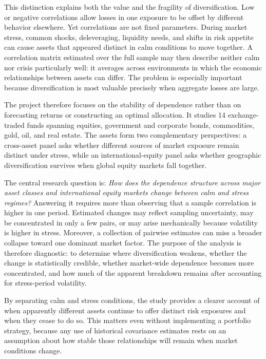 This distinction explains both the value and the fragility of diversification. Low or negative correlations allow losses in one exposure to be offset by different behavior elsewhere. Yet correlations are not fixed parameters. During market stress, common shocks, deleveraging, liquidity needs, and shifts in risk appetite can cause assets that appeared distinct in calm conditions to move together. A correlation matrix estimated over the full sample may then describe neither calm nor crisis particularly well: it averages across environments in which the economic relationships between assets can differ. The problem is especially important because diversification is most valuable precisely when aggregate losses are large.

The project therefore focuses on the stability of dependence rather than on forecasting returns or constructing an optimal allocation. It studies 14 exchange-traded funds spanning equities, government and corporate bonds, commodities, gold, oil, and real estate. The assets form two complementary perspectives: a cross-asset panel asks whether different sources of market exposure remain distinct under stress, while an international-equity panel asks whether geographic diversification survives when global equity markets fall together.

The central research question is: \emph{How does the dependence structure across major asset classes and international equity markets change between calm and stress regimes?} Answering it requires more than observing that a sample correlation is higher in one period. Estimated changes may reflect sampling uncertainty, may be concentrated in only a few pairs, or may arise mechanically because volatility is higher in stress. Moreover, a collection of pairwise estimates can miss a broader collapse toward one dominant market factor. The purpose of the analysis is therefore diagnostic: to determine where diversification weakens, whether the change is statistically credible, whether market-wide dependence becomes more concentrated, and how much of the apparent breakdown remains after accounting for stress-period volatility.

By separating calm and stress conditions, the study provides a clearer account of when apparently different assets continue to offer distinct risk exposures and when they cease to do so. This matters even without implementing a portfolio strategy, because any use of historical covariance estimates rests on an assumption about how stable those relationships will remain when market conditions change.
